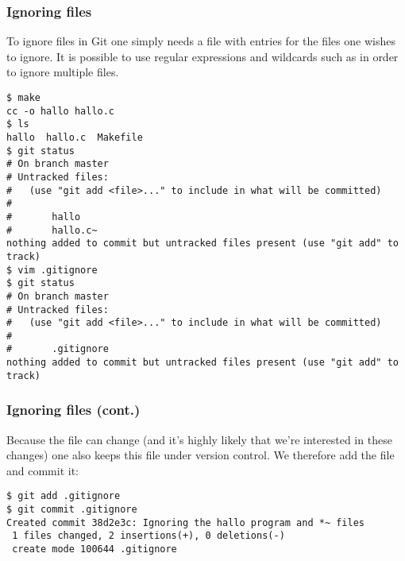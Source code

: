 \begin{frame}[fragile]
\frametitle{Ignoring files}

To ignore files in Git one simply needs a  file with
entries for the files one wishes to ignore.  It is possible to use regular
expressions and wildcards such as  in order to ignore multiple
files.

\begin{lstlisting}[basicstyle=\tiny\ttfamily\color{black}]
$ make
cc -o hallo hallo.c
$ ls
hallo  hallo.c  Makefile
$ git status
# On branch master
# Untracked files:
#   (use "git add <file>..." to include in what will be committed)
#
#       hallo
#       hallo.c~
nothing added to commit but untracked files present (use "git add" to track)
$ vim .gitignore
$ git status
# On branch master
# Untracked files:
#   (use "git add <file>..." to include in what will be committed)
#
#       .gitignore
nothing added to commit but untracked files present (use "git add" to track)
\end{lstlisting}

\end{frame}

\begin{frame}[fragile]
    \frametitle{Ignoring files (cont.)}

Because the  file can change (and it's highly likely
that we're interested in these changes) one also keeps this file under
version control.  We therefore add the file and commit it:
\begin{lstlisting}
$ git add .gitignore
$ git commit .gitignore
Created commit 38d2e3c: Ignoring the hallo program and *~ files
 1 files changed, 2 insertions(+), 0 deletions(-)
 create mode 100644 .gitignore
\end{lstlisting}
\end{frame}

